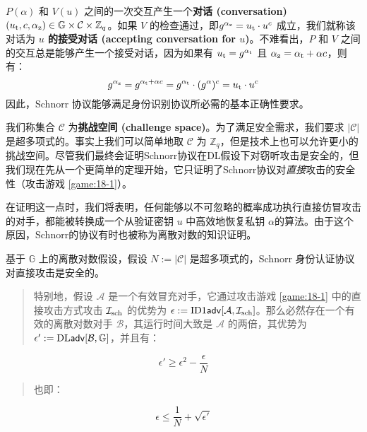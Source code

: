 $P(\alpha)$ 和 $V(u)$ 之间的一次交互产生一个\textbf{对话 (conversation)} $(u_{\rm t},c,\alpha_{\rm z})\in \mathbb{G}\times \mathcal{C}\times \mathbb{Z}_q$。如果 $V$ 的检查通过，即$g^{\alpha_{\rm z}}=u_{\rm t}\cdot u^c$ 成立，我们就称该对话为 \textbf{$u$ 的接受对话 (accepting conversation for $u$)}。不难看出，$P$ 和 $V$ 之间的交互总是能够产生一个接受对话，因为如果有 $u_{\rm t}=g^{\alpha_{\rm t}}$ 且 $\alpha_{\rm z}=\alpha_{\rm t}+\alpha c$，则有：
\[
g^{\alpha_{\rm z}}=g^{\alpha_{\rm t}+\alpha c}=g^{\alpha_{\rm t}}\cdot (g^\alpha)^c=u_{\rm t}\cdot u^c
\]
因此，Schnorr 协议能够满足身份识别协议所必需的基本正确性要求。

我们称集合 $\mathcal{C}$ 为\textbf{挑战空间 (challenge space)}。为了满足安全需求，我们要求 $|\mathcal{C}|$ 是超多项式的。事实上我们可以简单地取 $\mathcal{C}$ 为 $\mathbb{Z}_q$，但是技术上也可以允许更小的挑战空间。尽管我们最终会证明Schnorr协议在DL假设下对窃听攻击是安全的，但我们现在先从一个更简单的定理开始，它只证明了Schnorr协议对\emph{直接}攻击的安全性（攻击游戏 \ref{game:18-1}）。

在证明这一点时，我们将表明，任何能够以不可忽略的概率成功执行直接仿冒攻击的对手，都能被转换成一个从验证密钥 $u$ 中高效地恢复私钥 $\alpha$的算法。由于这个原因，Schnorr的协议有时也被称为离散对数的知识证明。

\begin{theorem}\label{theo:19-1}
	基于 $\mathbb{G}$ 上的离散对数假设，假设 $N:=|\mathcal{C}|$ 是超多项式的，Schnorr 身份认证协议对直接攻击是安全的。
	\begin{quote}
		特别地，假设 $\mathcal{A}$ 是一个有效冒充对手，它通过攻击游戏 \ref{game:18-1} 中的直接攻击方式攻击 $\mathcal{I}_{\rm sch}$ 的优势为 $\epsilon:={\rm ID1\mathsf{adv}}[\mathcal{A},\mathcal{I}_{\rm sch}]$。那么必然存在一个有效的离散对数对手 $\mathcal{B}$，其运行时间大致是 $\mathcal{A}$ 的两倍，其优势为 $\epsilon':={\rm DL\mathsf{adv}}[\mathcal{B},\mathbb{G}]$，并且有：
	\end{quote}
	\begin{equation}\label{eq:19-1}
		\epsilon'\geq \epsilon^2-\frac{\epsilon}{N}
	\end{equation}
	\begin{quote}
		也即：
	\end{quote}
	\begin{equation}\label{eq:19-2}
		\epsilon\leq\frac{1}{N}+\sqrt{\epsilon'}
	\end{equation}
\end{theorem}

